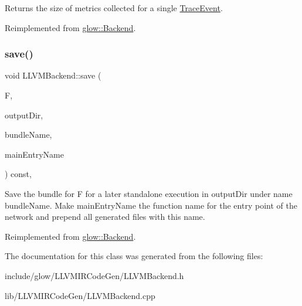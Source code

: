 \begin{DoxyReturn}{Returns}
the size of metrics collected for a single \hyperlink{structglow_1_1_trace_event}{Trace\+Event}. 
\end{DoxyReturn}


Reimplemented from \hyperlink{classglow_1_1_backend}{glow\+::\+Backend}.

\mbox{\label{classglow_1_1_l_l_v_m_backend_a94aaf63b75e4e711c72aebb4a3c6c173}} 
\subsubsection{\texorpdfstring{save()}{save()}}
{\footnotesize\ttfamily void L\+L\+V\+M\+Backend\+::save (\begin{DoxyParamCaption}\item[{\hyperlink{classglow_1_1_function}{Function} $\ast$}]{F,  }\item[{llvm\+::\+String\+Ref}]{output\+Dir,  }\item[{llvm\+::\+String\+Ref}]{bundle\+Name,  }\item[{llvm\+::\+String\+Ref}]{main\+Entry\+Name }\end{DoxyParamCaption}) const\hspace{0.3cm}{\ttfamily [override]}, {\ttfamily [virtual]}}

Save the bundle for {\ttfamily F} for a later standalone execution in {\ttfamily output\+Dir} under name {\ttfamily bundle\+Name}. Make {\ttfamily main\+Entry\+Name} the function name for the entry point of the network and prepend all generated files with this name. 

Reimplemented from \hyperlink{classglow_1_1_backend_a651bea6e585b017287c1cbb02cdfd822}{glow\+::\+Backend}.



The documentation for this class was generated from the following files\+:\begin{DoxyCompactItemize}
\item 
include/glow/\+L\+L\+V\+M\+I\+R\+Code\+Gen/L\+L\+V\+M\+Backend.\+h\item 
lib/\+L\+L\+V\+M\+I\+R\+Code\+Gen/L\+L\+V\+M\+Backend.\+cpp\end{DoxyCompactItemize}
